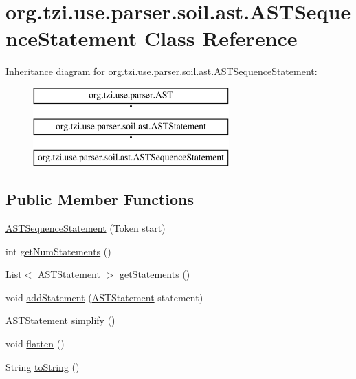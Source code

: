 \hypertarget{classorg_1_1tzi_1_1use_1_1parser_1_1soil_1_1ast_1_1_a_s_t_sequence_statement}{\section{org.\-tzi.\-use.\-parser.\-soil.\-ast.\-A\-S\-T\-Sequence\-Statement Class Reference}
\label{classorg_1_1tzi_1_1use_1_1parser_1_1soil_1_1ast_1_1_a_s_t_sequence_statement}
}
Inheritance diagram for org.\-tzi.\-use.\-parser.\-soil.\-ast.\-A\-S\-T\-Sequence\-Statement\-:\begin{figure}[H]
\begin{center}
\leavevmode
\includegraphics[height=3.000000cm]{classorg_1_1tzi_1_1use_1_1parser_1_1soil_1_1ast_1_1_a_s_t_sequence_statement}
\end{center}
\end{figure}
\subsection*{Public Member Functions}
\begin{DoxyCompactItemize}
\item 
\hyperlink{classorg_1_1tzi_1_1use_1_1parser_1_1soil_1_1ast_1_1_a_s_t_sequence_statement_ae4ed9ce91a46c6968409cbe0cd9dec54}{A\-S\-T\-Sequence\-Statement} (Token start)
\item 
int \hyperlink{classorg_1_1tzi_1_1use_1_1parser_1_1soil_1_1ast_1_1_a_s_t_sequence_statement_a8e92057aa05ae9cdb3baff8ebf50371f}{get\-Num\-Statements} ()
\item 
List$<$ \hyperlink{classorg_1_1tzi_1_1use_1_1parser_1_1soil_1_1ast_1_1_a_s_t_statement}{A\-S\-T\-Statement} $>$ \hyperlink{classorg_1_1tzi_1_1use_1_1parser_1_1soil_1_1ast_1_1_a_s_t_sequence_statement_a0b3f7756dbaa15a7ff86f939095e72a0}{get\-Statements} ()
\item 
void \hyperlink{classorg_1_1tzi_1_1use_1_1parser_1_1soil_1_1ast_1_1_a_s_t_sequence_statement_a568b2154447b3186831e06cdbeb028c2}{add\-Statement} (\hyperlink{classorg_1_1tzi_1_1use_1_1parser_1_1soil_1_1ast_1_1_a_s_t_statement}{A\-S\-T\-Statement} statement)
\item 
\hyperlink{classorg_1_1tzi_1_1use_1_1parser_1_1soil_1_1ast_1_1_a_s_t_statement}{A\-S\-T\-Statement} \hyperlink{classorg_1_1tzi_1_1use_1_1parser_1_1soil_1_1ast_1_1_a_s_t_sequence_statement_aa942750d5b51032789ece6c741a6d909}{simplify} ()
\item 
void \hyperlink{classorg_1_1tzi_1_1use_1_1parser_1_1soil_1_1ast_1_1_a_s_t_sequence_statement_a9e56da2830086c9b1fe0a9dbc28d110f}{flatten} ()
\item 
String \hyperlink{classorg_1_1tzi_1_1use_1_1parser_1_1soil_1_1ast_1_1_a_s_t_sequence_statement_ade7c68f8f5420ae181e24cd30a65985c}{to\-String} ()
\end{DoxyCompactItemize}
